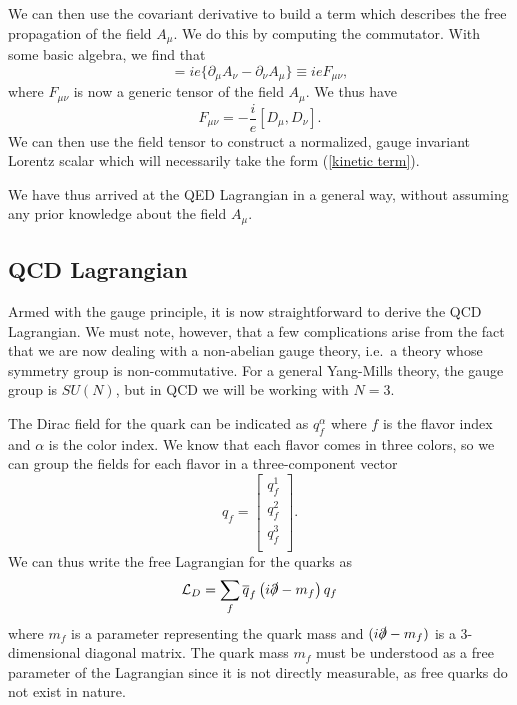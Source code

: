 \documentclass[10pt,a4paper]{book}
\begin{document}
We can then use the covariant derivative to build a term which describes the free propagation of the field $A_\mu$. We do this by computing the commutator. With some basic algebra, we find that 
\begin{equation}
[D_\mu, D_\nu] = ie \lbrace \partial_\mu A_\nu - \partial_\nu A_\mu \rbrace \equiv ie F_{\mu\nu},
\end{equation}
where $F_{\mu \nu}$ is now a generic tensor of the field $A_\mu$. We thus have
\begin{equation}
F_{\mu \nu} = -\frac{i}{e}[D_\mu, D_\nu].
\end{equation}
We can then use the field tensor to construct a normalized, gauge invariant Lorentz scalar which will necessarily take the form (\ref{kinetic term}).

We have thus arrived at the QED Lagrangian in a general way, without assuming any prior knowledge about the field $A_\mu$. 

\subsection{QCD Lagrangian}

Armed with the gauge principle, it is now straightforward to derive the QCD Lagrangian. We must note, however, that a few complications arise from the fact that we are now dealing with a non-abelian gauge theory, i.e.\ a theory whose symmetry group is non-commutative. For a general Yang-Mills theory, the gauge group is $SU(N)$, but in QCD we will be working with $N = 3$. 

The Dirac field for the quark can be indicated as $q_f^\alpha$ where $f$ is the flavor index and $\alpha$ is the color index. We know that each flavor comes in three colors, so we can group the fields for each flavor in a three-component vector
\begin{equation}
q_f = 	\begin{bmatrix} 	
		q^1_f \\ 
		q^2_f \\
		q^3_f \\
		\end{bmatrix}.
\end{equation}
We can thus write the free Lagrangian for the quarks as 
\begin{equation}
\mathcal{L}_D = \sum_f\overline{q}_f\left(i\slashed{\partial} - m_f\right)q_f
\end{equation}
where $m_f$ is a parameter representing the quark mass and $(i\slashed{\partial} - m_f)$ is a 3-dimensional diagonal matrix. The quark mass $m_f$ must be understood as a free parameter of the Lagrangian since it is not directly measurable, as free quarks do not exist in nature.
\end{document}
